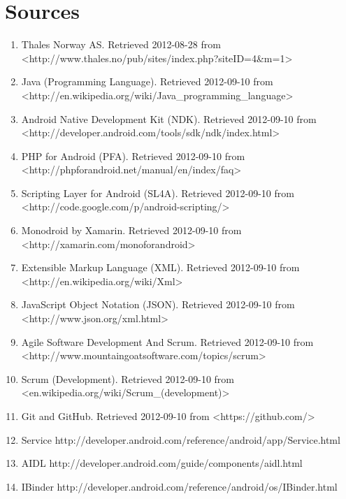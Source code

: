 \chapter{Sources}

\begin{enumerate}
\item{} Thales Norway AS. Retrieved 2012-08-28 from 
\newline
<http://www.thales.no/pub/sites/index.php?siteID=4\&m=1>
\item{} Java (Programming Language). Retrieved 2012-09-10 from
\newline
<http://en.wikipedia.org/wiki/Java\_programming\_language>
\item{} Android Native Development Kit (NDK). Retrieved 2012-09-10 from <http://developer.android.com/tools/sdk/ndk/index.html>
\item{}PHP for Android (PFA). Retrieved 2012-09-10 from 
\newline
<http://phpforandroid.net/manual/en/index/faq>
\item{}Scripting Layer for Android (SL4A). Retrieved 2012-09-10 from 
\newline
<http://code.google.com/p/android-scripting/>

\item{}Monodroid by Xamarin. Retrieved 2012-09-10 from 
\newline
<http://xamarin.com/monoforandroid>
\item{}Extensible Markup Language (XML). Retrieved 2012-09-10 from 
\newline
<http://en.wikipedia.org/wiki/Xml>
\item{}JavaScript Object Notation (JSON). Retrieved 2012-09-10 from 
\newline
<http://www.json.org/xml.html>
\item{}Agile Software Development And Scrum. Retrieved 2012-09-10 from
\newline
<http://www.mountaingoatsoftware.com/topics/scrum>
\item{}Scrum (Development). Retrieved 2012-09-10 from 
\newline
<en.wikipedia.org/wiki/Scrum\_(development)>
\item{}Git and GitHub. Retrieved 2012-09-10 from <https://github.com/>
\item{}Service http://developer.android.com/reference/android/app/Service.html
\item{}AIDL http://developer.android.com/guide/components/aidl.html
\item{}IBinder http://developer.android.com/reference/android/os/IBinder.html


\end{enumerate}


